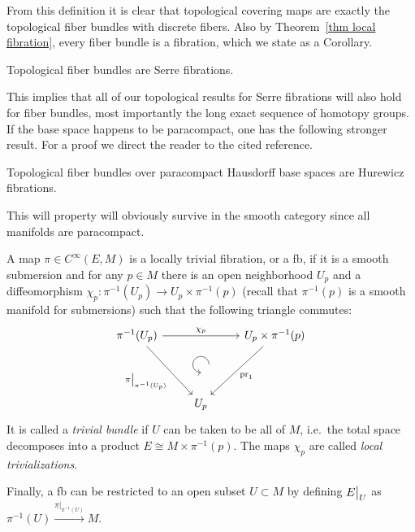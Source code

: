 From this definition it is clear that topological covering maps are exactly the topological fiber bundles with discrete fibers. Also by Theorem~\ref{thm local fibration}, every fiber bundle is a fibration, which we state as a Corollary. 

\begin{cor}[{{\cite[Cor.~3.2.5]{RS2}}}]
    Topological fiber bundles are Serre fibrations.
\end{cor}

This implies that all of our topological results for Serre fibrations will also hold for fiber bundles, most importantly the long exact sequence of homotopy groups. If the base space happens to be paracompact, one has the following stronger result. For a proof we direct the reader to the cited reference.

\begin{cor}
    Topological fiber bundles over paracompact Hausdorff base spaces are Hurewicz fibrations.
\end{cor}

This will property will obviously survive in the smooth category since all manifolds are paracompact.

\begin{defn}
    A map $\pi\in C^\infty(E,M)$ is a locally trivial fibration, or a \gls{fb}, if it is a smooth submersion and for any $p\in M$ there is an open neighborhood $U_p$ and a diffeomorphism $\chi_p:\pi^{-1}(U_p)\to U_p\times \pi^{-1}(p)$ (recall that $\pi^{-1}(p)$ is a smooth manifold for submersions) such that the following triangle commutes:
    \[
    \begin{tikzcd}[every matrix/.append style={name=m},   
    execute at end picture={\draw [<-] ([xshift=0mm,yshift=-2mm]m-2-2.north) arc[start angle=-90,delta angle=-270,radius=0.25cm];}]
       \pi^{-1}(U_p) \arrow[rr,"\chi_p"]\arrow[ddr,swap,"\restr{\pi}{\pi^{-1}(U_p)}"]& & U_p\times \pi^{-1}(p)\arrow[ddl,"\pr_1"]\\
       & \, & \\
       & U_p & 
    \end{tikzcd}
    \]
    It is called a \emph{trivial bundle} if $U$ can be taken to be all of $M$, i.e.\ the total space decomposes into a product $E\cong M\times \pi^{-1}(p)$. The maps $\chi_p$ are called \emph{local trivializations}.
    
    Finally, a \gls{fb} can be restricted to an open subset $U\subset M$ by defining $\restr{E}{U}$ as $\pi^{-1}(U)\overset{\pi|_{\pi^{-1}(U)}}{\longrightarrow}M$.
\end{defn}

